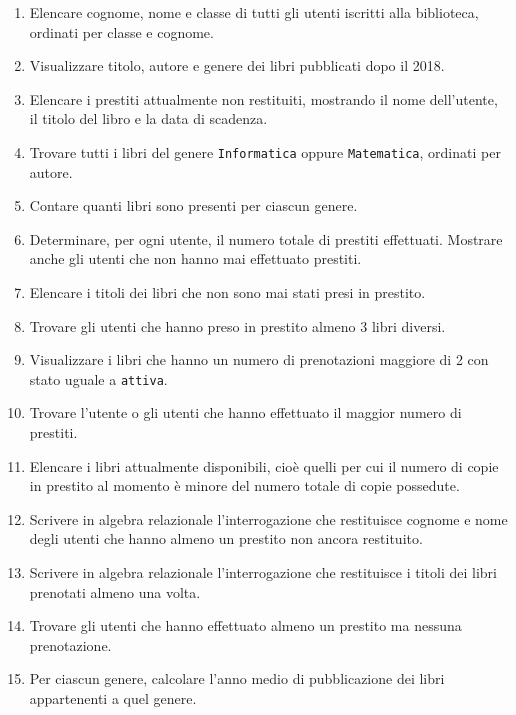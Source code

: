 \documentclass[a4paper,12pt]{article}
\begin{document}
	\begin{enumerate}
		\item Elencare cognome, nome e classe di tutti gli utenti iscritti alla biblioteca, ordinati per classe e cognome.
		
		\item Visualizzare titolo, autore e genere dei libri pubblicati dopo il 2018.
		
		\item Elencare i prestiti attualmente non restituiti, mostrando il nome dell'utente, il titolo del libro e la data di scadenza.
		
		\item Trovare tutti i libri del genere \texttt{Informatica} oppure \texttt{Matematica}, ordinati per autore.
		
		\item Contare quanti libri sono presenti per ciascun genere.
		
		\item Determinare, per ogni utente, il numero totale di prestiti effettuati. Mostrare anche gli utenti che non hanno mai effettuato prestiti.
		
		\item Elencare i titoli dei libri che non sono mai stati presi in prestito.
		
		\item Trovare gli utenti che hanno preso in prestito almeno 3 libri diversi.
		
		\item Visualizzare i libri che hanno un numero di prenotazioni maggiore di 2 con stato uguale a \texttt{attiva}.
		
		\item Trovare l'utente o gli utenti che hanno effettuato il maggior numero di prestiti.
		
		\item Elencare i libri attualmente disponibili, cioè quelli per cui il numero di copie in prestito al momento è minore del numero totale di copie possedute.
		
		\item Scrivere in algebra relazionale l'interrogazione che restituisce cognome e nome degli utenti che hanno almeno un prestito non ancora restituito.
		
		\item Scrivere in algebra relazionale l'interrogazione che restituisce i titoli dei libri prenotati almeno una volta.
		
		\item Trovare gli utenti che hanno effettuato almeno un prestito ma nessuna prenotazione.
		
		\item Per ciascun genere, calcolare l'anno medio di pubblicazione dei libri appartenenti a quel genere.
	\end{enumerate}
	
\end{document}
